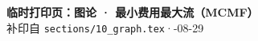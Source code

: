 \documentclass{article}
\begin{document}
	\begin{center}
		{\Large \textbf{临时打印页：图论 · 最小费用最大流（MCMF）}} \\[4pt]
		{\small 补印自 \texttt{sections/10\_graph.tex}\quad·-08-29}
	\end{center}

	\vspace{0.5em}

	
\end{document}

